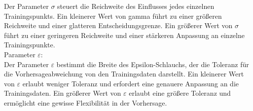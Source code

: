 \documentclass[a4paper,12pt]{article}
\begin{document}
Der Parameter $\sigma$ steuert die Reichweite des Einflusses jedes 
einzelnen Trainingspunkts. Ein kleinerer Wert von gamma führt zu einer größeren Reichweite 
und einer glatteren Entscheidungsgrenze. Ein größerer Wert von $\sigma$ führt zu einer 
geringeren Reichweite und einer stärkeren Anpassung an einzelne Trainingspunkte. \\



Parameter $\varepsilon$:\\

Der Parameter $\varepsilon$ bestimmt die Breite des Epsilon-Schlauchs, 
der die Toleranz für die Vorhersageabweichung von den Trainingsdaten darstellt. 
Ein kleinerer Wert von $\varepsilon$ erlaubt weniger Toleranz und erfordert eine 
genauere Anpassung an die Trainingsdaten. 
Ein größerer Wert von $\varepsilon$ erlaubt eine größere Toleranz und ermöglicht eine 
gewisse Flexibilität in der Vorhersage.
\end{document}
